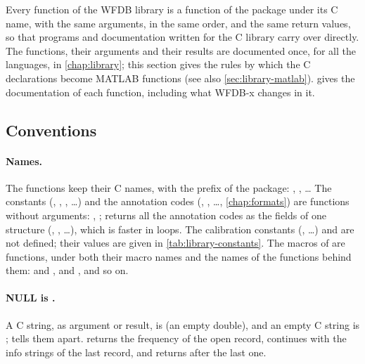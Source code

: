 Every function of the WFDB library is a function of the package  under its C
name, with the same arguments, in the same order, and the same return values, so that
programs and documentation written for the C library carry over directly. The functions,
their arguments and their results are documented once, for all the languages, in
\cref{chap:library}; this section gives the rules by which the C declarations become
MATLAB functions (see also \cref{sec:library-matlab}).  gives the
documentation of each function, including what WFDB-x changes in it.

\subsection{Conventions}

\paragraph{Names.} The functions keep their C names, with the prefix of the package:
, , \ldots{} The constants (,
, , \ldots) and the annotation codes
(, , \ldots, \cref{chap:formats}) are functions without arguments:
, ;  returns all
the annotation codes as the fields of one structure (, ,
\ldots), which is faster in loops. The calibration constants (,
\ldots) and  are not defined; their values are given in
\cref{tab:library-constants}. The macros of  are functions, under
both their macro names and the names of the functions behind them:
 and ,  and
, and so on.

\paragraph{NULL is \code{[]}.} A C  string, as argument or result, is
\code{[]} (an empty double), and an empty C string is ;  tells them
apart.  returns the frequency of the open record,
 continues with the info strings of the last record, and
 returns \code{[]} after the last one.

